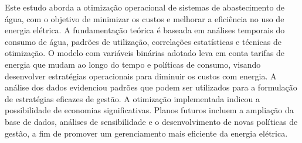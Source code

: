Este estudo aborda a otimização operacional de sistemas de abastecimento de água, com o objetivo de minimizar os custos e melhorar a eficiência no uso de energia elétrica. A fundamentação teórica é baseada em análises temporais do consumo de água, padrões de utilização, correlações estatísticas e técnicas de otimização. O modelo com variáveis binárias adotado leva em conta tarifas de energia que mudam ao longo do tempo e políticas de consumo, visando desenvolver estratégias operacionais para diminuir os custos com energia. A análise dos dados evidenciou padrões que podem ser utilizados para a formulação de estratégias eficazes de gestão. A otimização implementada indicou a possibilidade de economias significativas. Planos futuros incluem a ampliação da base de dados, análises de sensibilidade e o desenvolvimento de novas políticas de gestão, a fim de promover um gerenciamento mais eficiente da energia elétrica.


